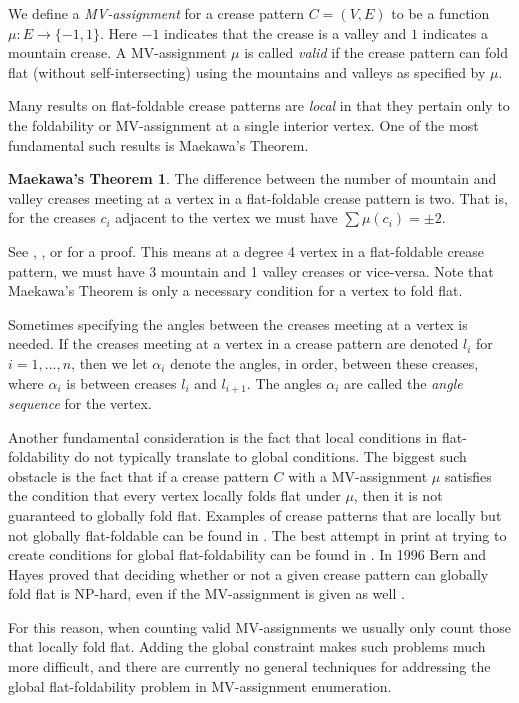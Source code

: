 \documentclass{amsart}
\theoremstyle{definition}
\newtheorem*{Maekawa}{Maekawa's Theorem}
\begin{document}
We define a {\em MV-assignment} for a crease pattern $C=(V,E)$ to be a function $\mu:E\rightarrow\{-1,1\}$.  Here $-1$ indicates that the crease is a valley and $1$ indicates a mountain crease.  A MV-assignment $\mu$ is called {\em valid} if the crease pattern can fold flat (without self-intersecting) using the mountains and valleys as specified by $\mu$.

Many results on flat-foldable crease patterns are {\em local} in that they pertain only to the foldability or MV-assignment at a single interior vertex.  One of the most fundamental such results is Maekawa's Theorem.

\begin{Maekawa}
The difference between the number of mountain and valley creases meeting at a vertex in a flat-foldable crease pattern is two. That is, for the creases $c_i$ adjacent to the vertex we must have $\sum \mu(c_i) = \pm2$.
\end{Maekawa}

See \cite{Hull1}, \cite{Hull2}, or \cite{H1} for a proof.  This means at a degree 4 vertex in a flat-foldable crease pattern, we must have 3 mountain and 1 valley creases or vice-versa.  Note that Maekawa's Theorem is only a necessary condition for a vertex to fold flat.  

Sometimes specifying the angles between the creases meeting at a vertex is needed.  If the creases meeting at a vertex in a crease pattern are denoted $l_i$ for $i=1,...,n$, then we let $\alpha_i$ denote the angles, in order, between these creases, where $\alpha_i$ is between creases $l_i$ and $l_{i+1}$.  The angles $\alpha_i$ are called the {\em angle sequence} for the vertex.

Another fundamental consideration is the fact that local conditions in flat-foldability do not typically translate to global conditions.  The biggest such obstacle is the fact that if a crease pattern $C$ with a MV-assignment $\mu$ satisfies the condition that every vertex locally folds flat under $\mu$, then it is not guaranteed to globally fold flat.  Examples of crease patterns that are locally but not globally flat-foldable can be found in \cite{Hull1, Hull2, H1}.  The best attempt in print at trying to create conditions for global flat-foldability can be found in \cite{Justin}.  In 1996 Bern and Hayes proved that deciding whether or not a given crease pattern can globally fold flat is NP-hard, even if the MV-assignment is given as well \cite{Bern}.  

For this reason, when counting valid MV-assignments we usually only count those that locally fold flat.  Adding the global constraint makes such problems much more difficult, and there are currently no general techniques for addressing the global flat-foldability problem in MV-assignment enumeration.
\end{document}
